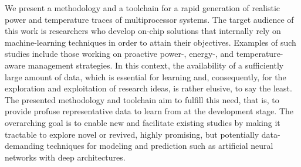 We present a methodology and a toolchain for a rapid generation of realistic
power and temperature traces of multiprocessor systems. The target audience of
this work is researchers who develop on-chip solutions that internally rely on
machine-learning techniques in order to attain their objectives. Examples of
such studies include those working on proactive power-, energy-, and
temperature-aware management strategies. In this context, the availability of a
sufficiently large amount of data, which is essential for learning and,
consequently, for the exploration and exploitation of research ideas, is rather
elusive, to say the least. The presented methodology and toolchain aim to
fulfill this need, that is, to provide profuse representative data to learn from
at the development stage. The overarching goal is to enable new and facilitate
existing studies by making it tractable to explore novel or revived, highly
promising, but potentially data-demanding techniques for modeling and prediction
such as artificial neural networks with deep architectures.
